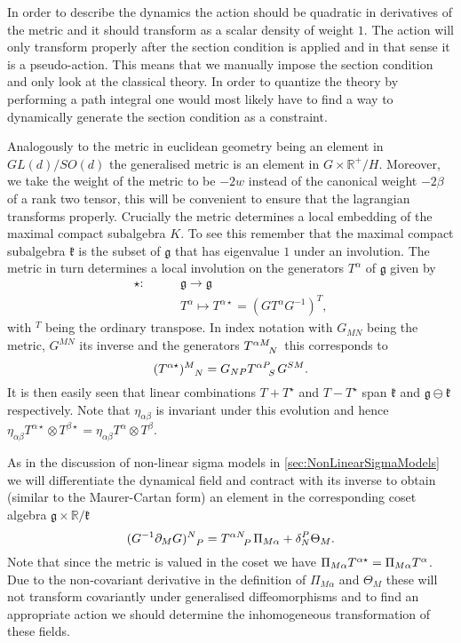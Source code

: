 In order to describe the dynamics the action should be quadratic in derivatives of the metric and it should transform as a scalar density of weight $1$. The action will only transform properly after the section condition is applied and in that sense it is a pseudo-action. This means that we manually impose the section condition and only look at the classical theory. In order to quantize the theory by performing a path integral one would most likely have to find a way to dynamically generate the section condition as a constraint. 

Analogously to the metric in euclidean geometry being an element in $GL(d)/SO(d)$ the generalised metric is an element in $G\times \mathbb{R}^+/H$. Moreover, we take the weight of the metric to be $-2w$ instead of the canonical weight $-2\beta$ of a rank two tensor, this will be convenient to ensure that the lagrangian transforms properly. Crucially the metric determines a local embedding of the maximal compact subalgebra $K$. To see this remember that the maximal compact subalgebra $\mathfrak{k}$ is the subset of $\mathfrak{g}$ that has eigenvalue $1$ under an involution. The metric in turn determines a local involution on the generators $T^\alpha$ of $\mathfrak{g}$ given by 
\begin{equation}
    \begin{aligned}
    \star:\qquad &\mathfrak{g}\to\mathfrak{g}\\
           &T^\alpha \mapsto T^{\alpha \star} = (GT^\alpha G^{-1})^T,
    \end{aligned}
\end{equation}
with $^T$ being the ordinary transpose. In index notation with $G_{MN}$ being the metric, $G^{MN}$ its inverse and the generators $\tensor{T}{^{\alpha M}_N}$ this corresponds to 
\begin{equation}
    (\tensor{T}{^{\alpha\star}})\tensor{}{^M_N} = G_{NP}\tensor{T}{^{\alpha P}_S}G^{SM}.
\end{equation}
It is then easily seen that linear combinations $T+T^\star$ and $T-T^\star$ span $\mathfrak{k}$ and $\mathfrak{g}\ominus\mathfrak{k}$ respectively. Note that $\eta_{\alpha\beta}$ is invariant under this evolution and hence $\eta_{\alpha\beta}T^{\alpha\star}\otimes T^{\beta\star}=\eta_{\alpha\beta}T^{\alpha}\otimes T^{\beta}$.

As in the discussion of non-linear sigma models in \ref{sec:NonLinearSigmaModels} we will differentiate the dynamical field and contract with its inverse to obtain (similar to the Maurer-Cartan form) an element in the corresponding coset algebra $\mathfrak{g}\times\mathbb{R}/\mathfrak{k}$
\begin{equation}
    (G^{-1}\pd_MG)\tensor{}{^N_P} = \tensor{T}{^{\alpha N}_P}\Pi_{M\alpha}+\delta^P_N\Theta_M.
\end{equation}
Note that since the metric is valued in the coset we have $\Pi_{M\alpha}\tensor{T}{^{\alpha \star}}=\Pi_{M\alpha}\tensor{T}{^{\alpha}}$. Due to the non-covariant derivative in the definition of $\Pi_{M\alpha}$ and $\Theta_M$ these will not transform covariantly under generalised diffeomorphisms and to find an appropriate action we should determine the inhomogeneous transformation of these fields. 

